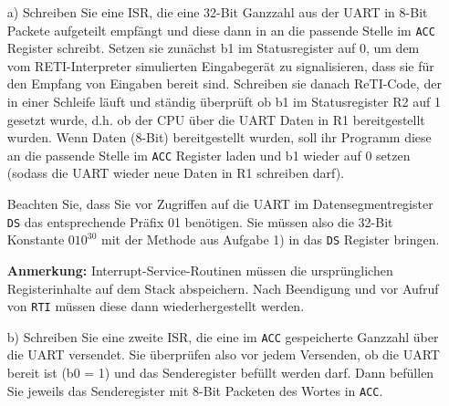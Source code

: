 \documentclass{article}
\begin{document}
\begin{itemize}
\item[a)]
Schreiben Sie eine ISR, die eine 32-Bit Ganzzahl aus der UART in 8-Bit Packete aufgeteilt empfängt und diese dann in an die passende Stelle im \texttt{ACC} Register schreibt. Setzen sie zunächst b1 im Statusregister auf 0, um dem vom RETI-Interpreter simulierten Eingabegerät zu signalisieren, dass sie für den Empfang von Eingaben bereit sind. Schreiben sie danach ReTI-Code, der in einer Schleife läuft und ständig überprüft ob b1 im Statusregister R2 auf 1 gesetzt wurde, d.h. ob der CPU über die UART Daten in R1 bereitgestellt wurden. Wenn Daten (8-Bit) bereitgestellt wurden, soll ihr Programm diese an die passende Stelle im \texttt{ACC} Register laden und b1 wieder auf 0 setzen (sodass die UART wieder neue Daten in R1 schreiben darf).

Beachten Sie, dass Sie vor Zugriffen auf die UART im Datensegmentregister \texttt{DS} das entsprechende Präfix 01 benötigen. Sie müssen also die 32-Bit Konstante $010^{30}$ mit der Methode aus Aufgabe 1) in das \texttt{DS} Register bringen.

\textbf{Anmerkung:} Interrupt-Service-Routinen müssen die ursprünglichen Registerinhalte auf dem Stack abspeichern. Nach Beendigung und vor Aufruf von \texttt{RTI} müssen diese dann wiederhergestellt werden.

\item[b)]
Schreiben Sie eine zweite ISR, die eine im \texttt{ACC} gespeicherte Ganzzahl über die UART versendet.
Sie überprüfen also vor jedem Versenden, ob die UART bereit ist (b0 = 1) und das Senderegister befüllt werden darf.
Dann befüllen Sie jeweils das Senderegister mit 8-Bit Packeten des Wortes in \texttt{ACC}.
\end{itemize}
\end{document}
